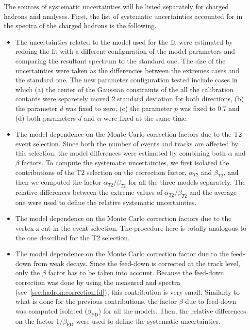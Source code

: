 The sources of systematic uncertainties will be listed
separately for charged hadrons and \vzero analyses.
First, the list of systematic uncertainties accounted for in
the spectra of the charged hadrons is the following.
\begin{itemize}

\item The uncertainties related to the \dedx model used for the \dedx fit were
  estimated by redoing the fit with a different configuration of the model parameters
  and comparing the resultant spectrum to the standard one. The size of the uncertainties
  were taken as the differencies between the extremes cases and the standard one. 
  The new parameter configuration tested include cases in which (a) the center of the Gaussian
  constraints of the all the calibration contants were separetely
  moved 2 standard deviation for both directions, (b) the parameter $d$ was fixed to zero,
  (c) the parameter $p$ was fixed to 0.7 and (d) both parameters $d$ and $\alpha$ were fixed at
  the same time. 
  
\item The model dependence on the Monte Carlo correction factors due to
  the T2 event selection. Since both the number of events and tracks
  are affected by this selection, the model differences were estimated by
  combining both $\alpha$ and $\beta$ factors. To compute the systematic
  uncertainties, we first isolated the contributions of the T2 selection on the
  correction factor, $\alpha_{T2}$ and $\beta_{T2}$, and then we computed
  the factor $\alpha_{T2}/\beta_{T2}$ for all the three models separately.
  The relative differences between the extreme values of $\alpha_{T2}/\beta_{T2}$
  and the average one were used to define the relative systematic uncertainties.

\item The model dependence on the Monte Carlo correction factors due to
  the vertex z cut in the event selection.
  The procedure here is totally analogous to the one described for the T2 selection.
  
\item The model dependence on the Monte Carlo correction factor due to
  the feed-down from weak decays. Since the feed-down is corrected
  at the track level, only the $\beta$ factor has to be taken into account.
  Because the feed-down correction was done by using the measured
  \lambs and \kzeros spectra (see~\cref{sec:hadron:correction:fd}),
  this contribution is very small. Similarly to what is done for the previous
  contributions, the factor $\beta$ due to feed-down was computed isolated ($\beta_\text{FD}$)
  for all the models. Then, the relative differences on the factor
  $1/\beta_\text{FD}$ were used to define the systematic uncertainties.


\end{itemize}
